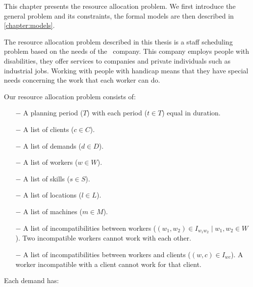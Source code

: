 \documentclass[../thesis.tex]{subfiles}
\begin{document}
This chapter presents the resource allocation problem.
We first introduce the general problem and its constraints, 
the formal models are then described in \autoref{chapter:models}.

The resource allocation problem described in this thesis is a staff scheduling problem based on the needs of the \vone\ company. 
This company employs people with disabilities, they offer services to companies and private individuals such 
as industrial jobs. Working with people with handicap means that they have special needs concerning
the work that each worker can do.




Our resource allocation problem consists of:

\begin{itemize}
  \item[$-$] A planning period ($T$) with each period ($t \in T$) equal in duration.
  \item[$-$] A list of clients ($c \in C$). 
  \item[$-$] A list of demands ($d \in D$).
  \item[$-$] A list of workers ($w \in W$). 
  \item[$-$] A list of skills ($s \in S$).
  \item[$-$] A list of locations ($l \in L$).
  \item[$-$] A list of machines ($m \in M$).
  \item[$-$] A list of incompatibilities between workers ($(w_1, w_2) \in I_{w_{1}w_{2}} \mid w_1, w_2 \in W$).
  Two incompatible workers cannot work with each other.  
  \item[$-$] A list of incompatibilities between workers and clients ($(w, c) \in I_{wc}$).
  A worker incompatible with a client cannot work for that client.
\end{itemize}

Each demand has:
\end{document}
